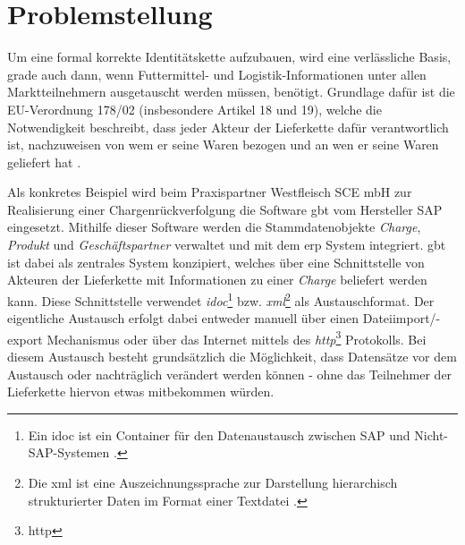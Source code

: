 \section{Problemstellung} \label{Problemstellung}

Um eine formal korrekte Identitätskette aufzubauen, wird eine verlässliche Basis, grade auch dann, wenn Futtermittel- und Logistik-Informationen unter allen Marktteilnehmern ausgetauscht werden müssen, benötigt. Grundlage dafür ist die EU-Verordnung 178/02 (insbesondere Artikel 18 und 19), welche die Notwendigkeit beschreibt, dass jeder Akteur der Lieferkette dafür verantwortlich ist, nachzuweisen von wem er seine Waren bezogen und an wen er seine Waren geliefert hat \citep{EPER2002}.

Als konkretes Beispiel wird beim Praxispartner Westfleisch SCE mbH zur Realisierung einer Chargenrückverfolgung die Software \ac{gbt} vom Hersteller SAP eingesetzt. Mithilfe dieser Software werden die Stammdatenobjekte \textit{Charge}, \textit{Produkt} und \textit{Geschäftspartner} verwaltet und mit dem \ac{erp} System integriert. \ac{gbt} ist dabei als zentrales System konzipiert, welches über eine Schnittstelle von Akteuren der Lieferkette mit Informationen zu einer \textit{Charge} beliefert werden kann. Diese Schnittstelle verwendet \textit{\acs{idoc}}\footnote{Ein \ac{idoc} ist ein Container für den Datenaustausch zwischen SAP und Nicht-SAP-Systemen \citep{SAP2019}.} bzw. \textit{\acs{xml}}\footnote{Die \ac{xml} ist eine Auszeichnungssprache zur Darstellung hierarchisch strukturierter Daten im Format einer Textdatei \citep{Yergeau2008}.} als Austauschformat. Der eigentliche Austausch erfolgt dabei entweder manuell über einen Dateiimport/-export Mechanismus oder über das Internet mittels des \textit{\acs{http}}\footnote{\ac{http}} Protokolls. Bei diesem Austausch besteht grundsätzlich die Möglichkeit, dass Datensätze vor dem Austausch oder nachträglich verändert werden können - ohne das Teilnehmer der Lieferkette hiervon etwas mitbekommen würden.\\


